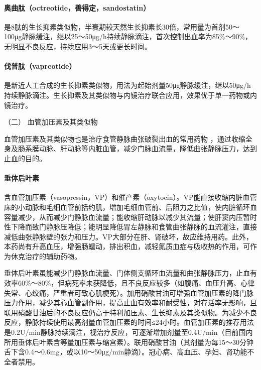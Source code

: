 \paragraph{奥曲肽（octreotide，善得定，sandostatin）}

是8肽的生长抑素类似物，半衰期较天然生长抑素长30倍，常用量为首剂50～100μg静脉缓注，继以25～50μg/h持续静脉滴注，首次控制出血率为85\%～90\%，无明显不良反应，持续应用3～5天或更长时间。

\paragraph{伐普肽（vapreotide）}

是新近人工合成的生长抑素类似物，用法为起始剂量50μg静脉缓注，继以50μg/h持续静脉滴注。生长抑素及其类似物与内镜治疗联合应用，效果优于单一药物或内镜治疗。

\hypertarget{text00328.htmlux5cux23CHP11-7-1-3-2-2}{}
（二） 血管加压素及其类似物

血管加压素及其类似物也是治疗食管静脉曲张破裂出血的常用药物
，通过收缩全身及肠系膜动脉、肝动脉等内脏血管，减少门脉血流量，降低曲张静脉压力，达到止血的目的。

\paragraph{垂体后叶素}

含血管加压素（vasopressin，VP）和催产素（oxytocin）。VP能直接收缩内脏血管床的小动脉和毛细血管前括约肌，增加毛细血管前、后阻力之比值，使内脏循环血容量减少，从而减少门静脉血流量；能收缩肝动脉以减少其流量；使肝窦内压暂时性下降而致门静脉压降低；能明显降低胃左静脉和食管曲张静脉的血流灌注，直接减低曲张静脉壁的张力和压力。VP大部分在肝、肾破坏，故应维持用药。此外，本药尚有升高血压，增强肠蠕动，排出积血，减轻氮质血症与吸收热的作用，可作为休克治疗的辅助药物。

垂体后叶素虽能减少门静脉血流量、门体侧支循环血流量和曲张静脉压力，止血有效率60\%～80\%，但病死率未获降低，且不良反应较多（如腹痛、血压升高、心律失常、心绞痛，严重者可致心肌梗死）。加用硝酸甘油可增强血管加压素的降门脉压力作用，减少其心血管副作用，提高止血有效率和耐受性，对存活率无影响，且联用硝酸甘油后的不良反应仍高于特利加压素、生长抑素及其类似物。为减少不良反应，静脉持续使用最高剂量血管加压素的时间≤24小时。血管加压素的推荐用法是0.2U/min静脉持续滴注，视治疗反应，可逐渐增加剂量至0.4U/min（目前国内所用垂体后叶素含等量加压素与缩宫素）。联用硝酸甘油（其剂量为每15～30分钟舌下含0.4～0.6mg，或以10～50μg/min静滴）。冠心病、高血压、孕妇、肾功能不全者禁用。

